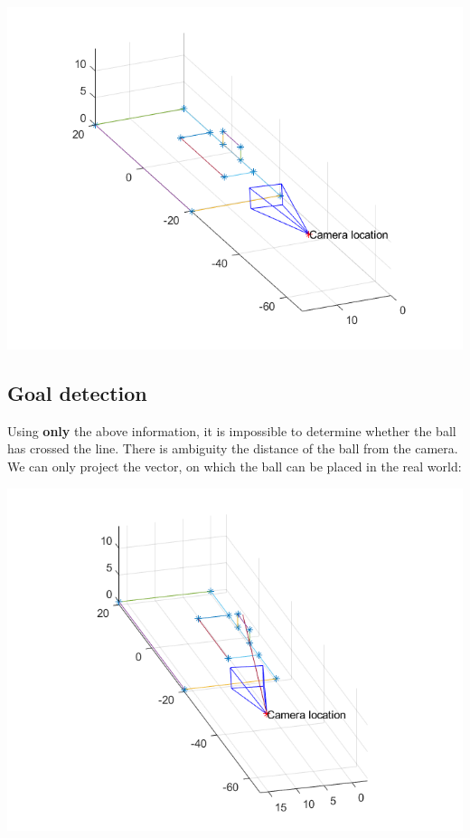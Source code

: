 \documentclass[a4paper]{iacas}
\begin{document}
\vskip 0.1in
\begin{minipage}{\linewidth}
	\includegraphics[scale=0.8]{goal_res/camera_loc.png}
	\label{fig_2}
\end{minipage}
\vskip 0.1in


\subsection{Goal detection}
Using \textbf{only} the above information, it is impossible to determine whether the ball has crossed the line. There is ambiguity the distance of the ball from the camera. We can only project the vector, on which the ball can be placed in the real world:

\vskip 0.1in
\begin{minipage}{\linewidth}
	\includegraphics[scale=0.8]{goal_res/goal_camera_frame.png}
	\label{fig_3}
\end{minipage}
\vskip 0.1in
\end{document}
